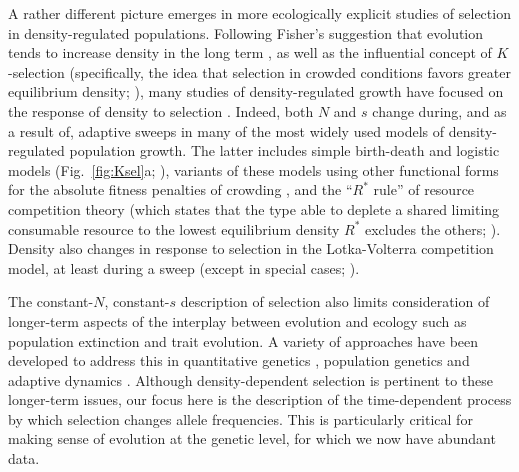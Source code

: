 \documentclass[12pt]{article}
\begin{document}
A rather different picture emerges in more ecologically explicit studies of selection in density-regulated populations. Following Fisher's suggestion that evolution tends to increase density in the long term \citep{fisher_1930, leon_1978, lande_2009}, as well as the influential concept of $K$-selection (specifically, the idea that selection in crowded conditions favors greater equilibrium density; \citealt{macarthur_1962}), many studies of density-regulated growth have focused on the response of density to selection \citep{kostitzin_1939,macarthur_1967,roughgarden_1979,christiansen_2004}. Indeed, both $N$ and $s$ change during, and as a result of, adaptive sweeps in many of the most widely used models of density-regulated population growth. The latter includes simple birth-death \citep{kostitzin_1939} and logistic models (Fig.~\ref{fig:Ksel}a; \citealt{macarthur_1962,roughgarden_1979,boyce_1984}), variants of these models using other functional forms for the absolute fitness penalties of crowding \citep{kimura_1978,charlesworth_1971,lande_2009,nagylaki_1979,lande_2009}, and the ``$R^*$ rule'' of resource competition theory (which states that the type able to deplete a shared limiting consumable resource to the lowest equilibrium density $R^*$ excludes the others; \citealt{grover_1997}). Density also changes in response to selection in the Lotka-Volterra competition model, at least during a sweep (except in special cases; \citealt{gill_1974,smouse_1976,mallet_2012}).

The constant-$N$, constant-$s$ description of selection also limits consideration of longer-term aspects of the interplay between evolution and ecology such as population extinction and trait evolution. A variety of approaches have been developed to address this in quantitative genetics \citep{burger1995evolution,engen_2013}, population genetics \citep{bertram2017predicting} and adaptive dynamics \citep{ferriere2013eco,dieckmann2004adaptive}. Although density-dependent selection is pertinent to these longer-term issues, our focus here is the description of the time-dependent process by which selection changes allele frequencies. This is particularly critical for making sense of evolution at the genetic level, for which we now have abundant data.
\end{document}
